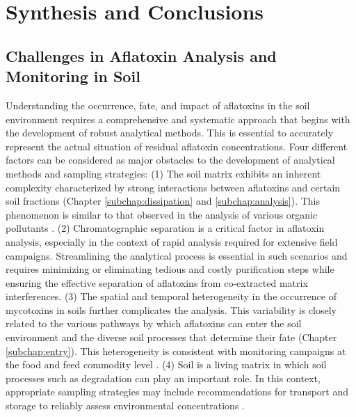 \chapter{Synthesis and Conclusions} \label{Chapter6}  

\clearpage

\section{Challenges in Aflatoxin Analysis and Monitoring in Soil} \label{subchap:synthesis_analysis}

Understanding the occurrence, fate, and impact of aflatoxins in the soil environment requires a comprehensive and systematic approach that begins with the development of robust analytical methods. This is essential to accurately represent the actual situation of residual aflatoxin concentrations. Four different factors can be considered as major obstacles to the development of analytical methods and sampling strategies: (1) The soil matrix exhibits an inherent complexity characterized by strong interactions between aflatoxins and certain soil fractions (Chapter \ref{subchap:dissipation} and \ref{subchap:analysis}). This phenomenon is similar to that observed in the analysis of various organic pollutants \citep{trellu2016removal}. (2) Chromatographic separation is a critical factor in aflatoxin analysis, especially in the context of rapid analysis required for extensive field campaigns. Streamlining the analytical process is essential in such scenarios and requires minimizing or eliminating tedious and costly purification steps while ensuring the effective separation of aflatoxins from co-extracted matrix interferences. (3) The spatial and temporal heterogeneity in the occurrence of mycotoxins in soils further complicates the analysis. This variability is closely related to the various pathways by which aflatoxins can enter the soil environment and the diverse soil processes that determine their fate (Chapter \ref{subchap:entry}). This heterogeneity is consistent with monitoring campaigns at the food and feed commodity level \citep{miraglia2005role}. (4) Soil is a living matrix in which soil processes such as degradation can play an important role. In this context, appropriate sampling strategies may include recommendations for transport and storage to reliably assess environmental concentrations \citep{wagner1995basic}.

